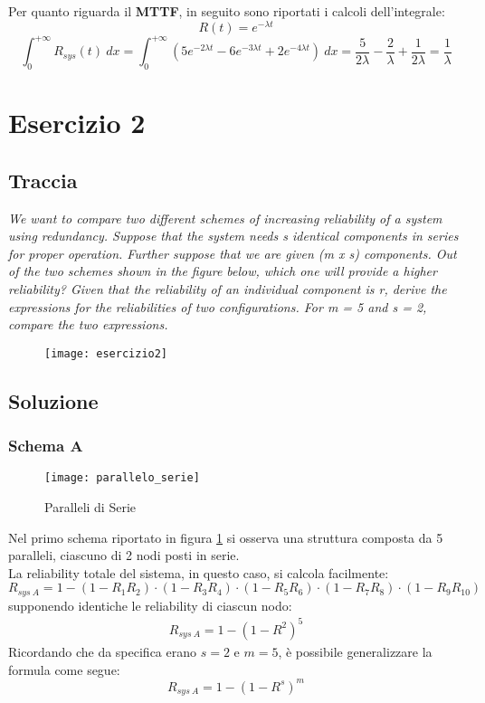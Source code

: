 Per quanto riguarda il \textbf{MTTF}, in seguito sono riportati
i calcoli dell'integrale:
$$R(t) = e^{-\lambda t}$$
$$\int_0^{+\infty} R_{sys}(t)\ dx =
\int_0^{+\infty} (5e^{-2\lambda t}-6e^{-3\lambda t}+2e^{-4\lambda t}) \ dx =
\frac{5}{2\lambda} - \frac{2}{\lambda} + \frac{1}{2\lambda} =
\frac{1}{\lambda}$$

\clearpage

\section{Esercizio 2}
\subsection{Traccia}
\textit{We want to compare two different schemes of increasing reliability of a
system using redundancy. Suppose that the system needs s identical components
in series for proper operation. Further suppose that we are given (m x s)
components. Out of the two schemes shown in the figure below, which one will
provide a higher reliability? Given that the reliability of an individual
component is r, derive the expressions for the reliabilities of two configurations.
For m = 5 and s = 2, compare the two expressions.}

\begin{figure}[!htbp]
  \centering
  \texttt{[image: esercizio2]}
\end{figure}

\clearpage
\subsection{Soluzione}

\subsubsection{Schema A}

\begin{figure}[!htbp]
  \centering
  \texttt{[image: parallelo\_serie]}
  \caption{Paralleli di Serie}
  \label{parallelo_serie}
\end{figure}

Nel primo schema riportato in figura \ref{parallelo_serie} si osserva una
struttura composta da 5 paralleli, ciascuno di 2 nodi posti in serie.\\
La reliability totale del sistema, in questo caso, si calcola facilmente:
$$R_{sys\ A} = 1-(1-R_1R_2)\cdot(1-R_3R_4)\cdot(1-R_5R_6)\cdot(1-R_7R_8)\cdot(1-R_9R_{10})$$
supponendo identiche le reliability di ciascun nodo:
\begin{align}
  R_{sys\ A} = 1-(1-R^2)^5
 \label{eq1}
\end{align}
Ricordando che da specifica erano $s=2$ e $m=5$, è possibile generalizzare la
formula come segue:
$$R_{sys\ A} = 1-(1-R^s)^m$$

